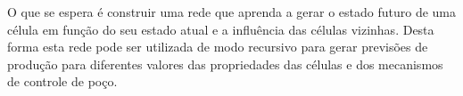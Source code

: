 \documentclass[final,5p]{elsarticle}
\numberwithin{equation}{section}
\begin{document}
    O que se espera é construir uma rede que aprenda a gerar o estado futuro de uma célula em função do seu estado atual e a influência das células vizinhas. Desta forma esta rede pode ser utilizada de modo recursivo para gerar previsões de produção para diferentes valores das propriedades das células e dos mecanismos de controle de poço.










\end{document}
